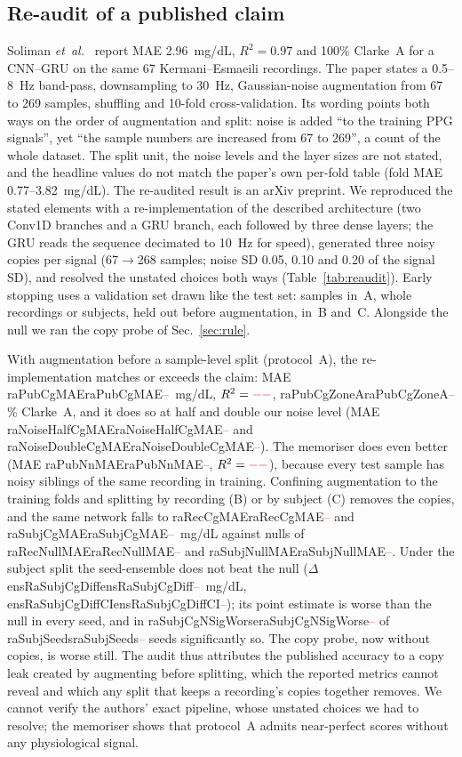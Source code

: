 \documentclass[journal]{IEEEtran}
\newcommand{\m}[1]{\ifcsname #1\endcsname\csname #1\endcsname\else\textcolor{red}{--}\fi}
\begin{document}
\subsection{Re-audit of a published claim}
\label{sec:reaudit}
Soliman \emph{et~al.}~\cite{soliman2024} report MAE 2.96~mg/dL, $R^2=0.97$
and 100\% Clarke~A for a CNN--GRU on the same 67 Kermani--Esmaeili
recordings.  The paper states a 0.5--8~Hz band-pass, downsampling to 30~Hz,
Gaussian-noise augmentation from 67 to 269 samples, shuffling and 10-fold
cross-validation.  Its wording points both ways on the order of augmentation
and split: noise is added ``to the training PPG signals'', yet ``the sample
numbers are increased from 67 to 269'', a count of the whole dataset.  The
split unit, the noise levels and the layer sizes are not stated, and the
headline values do not match the paper's own per-fold table (fold MAE
0.77--3.82~mg/dL).  The re-audited result is an arXiv preprint.  We
reproduced the stated elements with a re-implementation of the described
architecture (two Conv1D branches and a GRU branch, each followed by three
dense layers; the GRU reads the sequence decimated to 10~Hz for speed),
generated three noisy copies per signal (67$\to$268 samples; noise SD 0.05,
0.10 and 0.20 of the signal SD), and resolved the unstated choices both ways
(Table~\ref{tab:reaudit}).  Early stopping uses a validation set drawn like
the test set: samples in~A, whole recordings or subjects, held out before
augmentation, in~B and~C.  Alongside the null we ran the copy probe of
Sec.~\ref{sec:rule}.

With augmentation before a sample-level split (protocol~A), the
re-implementation matches or exceeds the claim: MAE \m{raPubCgMAE}~mg/dL,
$R^2=\m{raPubCgRtwo}$, \m{raPubCgZoneA}\% Clarke~A, and it does so at half and
double our noise level (MAE \m{raNoiseHalfCgMAE} and \m{raNoiseDoubleCgMAE}).  The memoriser does even
better (MAE \m{raPubNnMAE}, $R^2=\m{raPubNnRtwo}$), because every test sample
has noisy siblings of the same recording in training.  Confining augmentation
to the training folds and splitting by recording (B) or by subject (C) removes
the copies, and the same network falls to \m{raRecCgMAE} and
\m{raSubjCgMAE}~mg/dL against nulls of \m{raRecNullMAE} and
\m{raSubjNullMAE}.  Under the subject split the seed-ensemble does not beat
the null ($\Delta$ \m{ensRaSubjCgDiff}~mg/dL, \m{ensRaSubjCgDiffCI}); its point
estimate is worse than the null in every seed, and in \m{raSubjCgNSigWorse} of
\m{raSubjSeeds} seeds significantly so.  The copy probe, now without copies,
is worse still.  The audit thus attributes
the published accuracy to a copy leak created by augmenting before splitting,
which the reported metrics cannot reveal and which any split that keeps a
recording's copies together removes.  We cannot verify the authors' exact pipeline,
whose unstated choices we had to resolve; the memoriser shows that protocol~A
admits near-perfect scores without any physiological signal.
\end{document}
